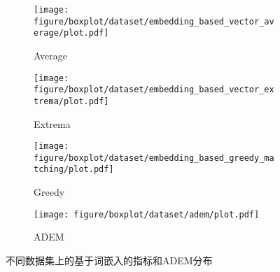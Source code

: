 \begin{figure}[H]
    \begin{subfigure}{0.5\linewidth}
        \texttt{[image: figure/boxplot/dataset/embedding\_based\_vector\_average/plot.pdf]}
        \centering
        \caption{Average}
    \end{subfigure}%
    \begin{subfigure}{0.5\linewidth}
        \texttt{[image: figure/boxplot/dataset/embedding\_based\_vector\_extrema/plot.pdf]}
        \centering
        \caption{Extrema}
    \end{subfigure}
    \begin{subfigure}{0.5\linewidth}
        \texttt{[image: figure/boxplot/dataset/embedding\_based\_greedy\_matching/plot.pdf]}
        \centering
        \caption{Greedy}
    \end{subfigure}%
    \begin{subfigure}{0.5\linewidth}
        \texttt{[image: figure/boxplot/dataset/adem/plot.pdf]}
        \centering
        \caption{ADEM}
        \label{subfig:ADEM_dataset}
    \end{subfigure}
    \caption{不同数据集上的基于词嵌入的指标和ADEM分布}
    \label{fig:ADEM_EB_dataset}
\end{figure}

